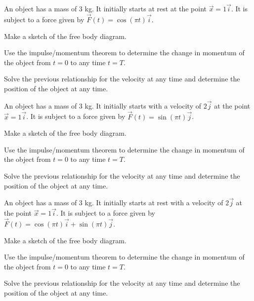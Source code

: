 \begin{problem}
\item An object has a mass of 3 kg. It initially starts at rest at the
  point $\vec{x}=1\vec{i}$. It is subject to a force given by
  $\vec{F}(t) = \cos(\pi t) \vec{i}$.
  \begin{subproblem}
    \item Make a sketch of the free body diagram.
      \vspace{5em}
    \item Use the impulse/momentum theorem to determine the change in
      momentum of the object from $t=0$ to any time $t=T$.
      \vfill
    \item Solve the previous relationship for the velocity at any time
      and determine the position of the object at any time.
      \vfill
  \end{subproblem}

  \clearpage

\item An object has a mass of 3 kg. It initially starts with a
  velocity of $2\vec{j}$ at the point $\vec{x}=1\vec{i}$. It is
  subject to a force given by $\vec{F}(t) = \sin(\pi t)\vec{j}$.
  \begin{subproblem}
    \item Make a sketch of the free body diagram.
      \vspace{5em}
    \item Use the impulse/momentum theorem to determine the change in
      momentum of the object from $t=0$ to any time $t=T$.
      \vfill
    \item Solve the previous relationship for the velocity at any time
      and determine the position of the object at any time.
      \vfill
  \end{subproblem}

  \clearpage

\item An object has a mass of 3 kg. It initially starts at rest with a
  velocity of $2\vec{j}$ at the point $\vec{x}=1\vec{i}$. It is
  subject to a force given by
  $\vec{F}(t) = \cos(\pi t)\vec{i}+\sin(\pi t)\vec{j}$.
  \begin{subproblem}
    \item Make a sketch of the free body diagram.
      \vspace{5em}
    \item Use the impulse/momentum theorem to determine the change in
      momentum of the object from $t=0$ to any time $t=T$.
      \vfill
    \item Solve the previous relationship for the velocity at any time
      and determine the position of the object at any time.
      \vfill
  \end{subproblem}

\end{problem}

